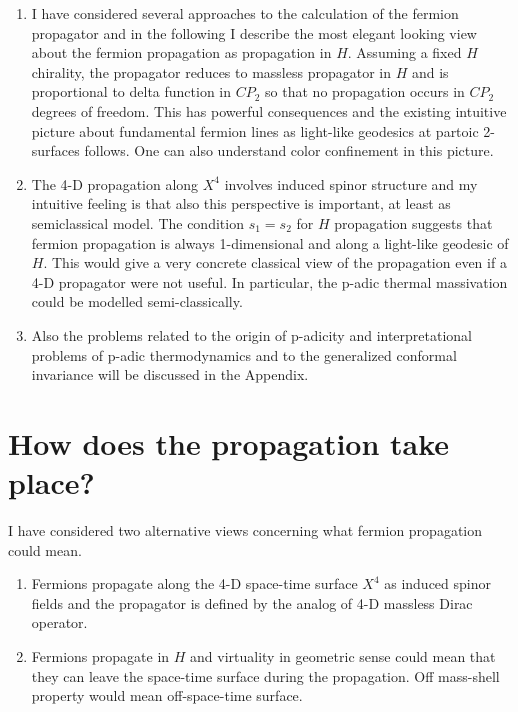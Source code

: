 \documentclass[10pt,epsf]{article}
\begin{document}
\begin{enumerate}

\item I have considered several approaches to the calculation of the fermion propagator and    in the following I describe  the most elegant looking view about the fermion  propagation as propagation in $H$.  Assuming a fixed $H$ chirality, the propagator reduces to massless propagator in $H$ and is proportional to  delta function in $CP_2$ so that no propagation occurs in $CP_2$ degrees of freedom. This has powerful consequences and  the existing intuitive picture about fundamental fermion lines as light-like geodesics at partoic 2-surfaces follows. One can also understand color confinement in this picture.

\item The 4-D propagation along $X^4$ involves induced spinor structure and  my  intuitive feeling is that  also this perspective is   important, at least as semiclassical model. The condition $s_1=s_2$ for $H$ propagation  suggests that fermion propagation is always 1-dimensional and along a light-like geodesic of $H$. This would give a very concrete classical view of the propagation even if a 4-D propagator were not useful. In particular, the p-adic thermal massivation could be modelled  semi-classically.

\item Also the problems related to the  origin of p-adicity and interpretational  problems of p-adic thermodynamics and to  the generalized conformal invariance will be discussed in the Appendix. 

\end{enumerate}






\section{How does the propagation take place?}


I have considered two alternative views concerning  what  fermion propagation could mean. 

\begin{enumerate} 

\item Fermions propagate along the 4-D space-time surface  $X^4$ as induced spinor fields and the propagator is defined by the analog of 4-D  massless Dirac operator.  

\item Fermions propagate in $H$ and virtuality in geometric sense could mean that they can  leave the space-time surface during the propagation. Off mass-shell property would mean off-space-time surface.

\end{enumerate}
\end{document}
